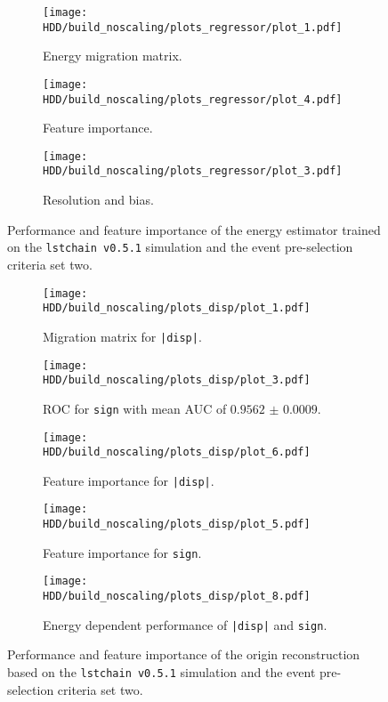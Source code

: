 \begin{figure}
    \centering
    \begin{subfigure}{0.49\textwidth}
        \centering
        \texttt{[image: HDD/build\_noscaling/plots\_regressor/plot\_1.pdf]}
        \caption{Energy migration matrix.}
    \end{subfigure}
    \hfill
    \begin{subfigure}{0.49\textwidth}
        \centering
        \texttt{[image: HDD/build\_noscaling/plots\_regressor/plot\_4.pdf]}
        \caption{Feature importance.}
    \end{subfigure}
    \newline\vfill
    \begin{subfigure}{0.7\textwidth}
        \centering
        \texttt{[image: HDD/build\_noscaling/plots\_regressor/plot\_3.pdf]}
        \caption{Resolution and bias.}
    \end{subfigure}
    \caption{Performance and feature importance of the energy estimator trained on the \texttt{lstchain v0.5.1} simulation and the event pre-selection criteria set two.}
    \label{fig:regressor_oldMC_150}
\end{figure}

\begin{figure}
    \centering
    \begin{subfigure}{0.49\textwidth}
        \centering
        \texttt{[image: HDD/build\_noscaling/plots\_disp/plot\_1.pdf]}
        \caption{Migration matrix for \texttt{|disp|}.}
    \end{subfigure}
    \hfill
    \begin{subfigure}{0.49\textwidth}
        \centering
        \texttt{[image: HDD/build\_noscaling/plots\_disp/plot\_3.pdf]}
        \caption{ROC for \texttt{sign} with mean AUC of $\num{0.9562(9)}$.}
    \end{subfigure}
    \newline\vfill
    \begin{subfigure}{0.49\textwidth}
        \centering
        \texttt{[image: HDD/build\_noscaling/plots\_disp/plot\_6.pdf]}
        \caption{Feature importance for \texttt{|disp|}.}
    \end{subfigure}
    \hfill
    \begin{subfigure}{0.49\textwidth}
        \centering
        \texttt{[image: HDD/build\_noscaling/plots\_disp/plot\_5.pdf]}
        \caption{Feature importance for \texttt{sign}.}
    \end{subfigure}
    \newline\vfill
    \begin{subfigure}{0.7\textwidth}
        \centering
        \texttt{[image: HDD/build\_noscaling/plots\_disp/plot\_8.pdf]}
        \caption{Energy dependent performance of \texttt{|disp|} and \texttt{sign}.}
    \end{subfigure}
    \caption{Performance and feature importance of the origin reconstruction based on the \texttt{lstchain v0.5.1} simulation and the event pre-selection criteria set two.}
    \label{fig:origin_oldMC_150}
\end{figure}

